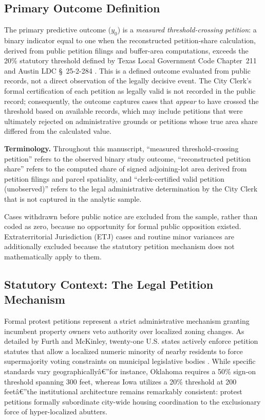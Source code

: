 \documentclass[twoside,11pt]{article}
\begin{document}
\subsection{Primary Outcome Definition}
\label{sec:outcome}

The primary predictive outcome ($y_0$) is a \emph{measured threshold-crossing petition}: a binary indicator equal to one when the reconstructed petition-share calculation, derived from public petition filings and buffer-area computations, exceeds the 20\% statutory threshold defined by Texas Local Government Code Chapter~211 and Austin LDC \S~25-2-284 \cite{texas211006}. This is a defined outcome evaluated from public records, not a direct observation of the legally decisive event. The City Clerk's formal certification of each petition as legally valid is not recorded in the public record; consequently, the outcome captures cases that \emph{appear} to have crossed the threshold based on available records, which may include petitions that were ultimately rejected on administrative grounds or petitions whose true area share differed from the calculated value.

\textbf{Terminology.} Throughout this manuscript, ``measured threshold-crossing petition'' refers to the observed binary study outcome, ``reconstructed petition share'' refers to the computed share of signed adjoining-lot area derived from petition filings and parcel spatiality, and ``clerk-certified valid petition (unobserved)'' refers to the legal administrative determination by the City Clerk that is not captured in the analytic sample.

Cases withdrawn before public notice are excluded from the sample, rather than coded as zero, because no opportunity for formal public opposition existed. Extraterritorial Jurisdiction (ETJ) cases and routine minor variances are additionally excluded because the statutory petition mechanism does not mathematically apply to them.

\subsection{Statutory Context: The Legal Petition Mechanism}
\label{sec:statutory_context}

\noindent Formal protest petitions represent a strict administrative mechanism granting incumbent property owners veto authority over localized zoning changes. As detailed by Furth and McKinley, twenty-one U.S. states actively enforce petition statutes that allow a localized numeric minority of nearby residents to force supermajority voting constraints on municipal legislative bodies \cite{furth2025protest}. While specific standards vary geographicallyâ€”for instance, Oklahoma requires a 50\% sign-on threshold spanning 300 feet, whereas Iowa utilizes a 20\% threshold at 200 feetâ€”the institutional architecture remains remarkably consistent: protest petitions formally subordinate city-wide housing coordination to the exclusionary force of hyper-localized abutters. 
\end{document}
